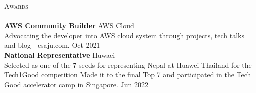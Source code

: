 \documentclass[a4paper]{article}
\newcommand{\lineunder} {
    \vspace*{-8pt} \\
    \hspace*{-18pt} \hrulefill \\
}
\newcommand{\header} [1] {
    {\hspace*{-18pt}\vspace*{6pt} \textsc{#1}}
    \vspace*{-6pt} \lineunder
}
\begin{document}
\header{Awards}
\textbf{AWS Community Builder} \hfill AWS Cloud\\
Advocating the developer into AWS cloud system through projects, tech talks and blog - csaju.com. \hfill Oct 2021\\
\vspace*{2mm}
\textbf{National Representative} \hfill Huwaei\\
Selected as one of the 7 seeds for representing Nepal at Huawei Thailand for the Tech1Good competition Made it to the final Top 7 and participated in the Tech Good accelerator camp in Singapore. \hfill Jun 2022\\
\vspace*{2mm}

\ 
\end{document}
